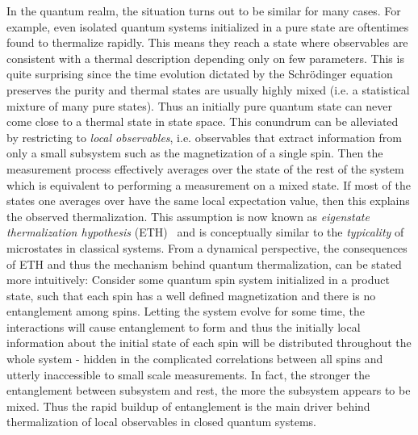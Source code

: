 In the quantum realm, the situation turns out to be similar for many cases. For example, even isolated quantum systems initialized in a pure state are oftentimes found to thermalize rapidly. This means they reach a state where observables are consistent with a thermal description depending only on few parameters. This is quite surprising since the time evolution dictated by the Schrödinger equation preserves the purity and %
 thermal states are usually highly mixed (i.e. a statistical mixture of many pure states). 
Thus an initially pure quantum state can never come close to a thermal state in state space. 
This conundrum can be alleviated by restricting to \emph{local observables}, i.e. observables that extract information from only a small subsystem such as the magnetization of a single spin. Then the measurement process effectively averages over the state of the rest of the system which is equivalent to performing a measurement on a mixed state. 
If most of the states one averages over have the same local expectation value, then this explains the observed thermalization. This assumption is now known as \emph{eigenstate thermalization hypothesis} (ETH)~\cite{deutschQuantumStatisticalMechanics1991,srednickiChaosQuantumThermalization1994, deutschEigenstateThermalizationHypothesis2018} and is conceptually similar to the \emph{typicality} of microstates in classical systems.
From a dynamical perspective, the consequences of ETH and thus the mechanism behind quantum thermalization, can be stated more intuitively: Consider some quantum spin system initialized in a product state, such that each spin has a well defined magnetization and there is no entanglement among spins. Letting the system evolve for some time, the interactions will cause entanglement to form and thus the initially local information about the initial state of each spin will be distributed throughout the whole system - hidden in the complicated correlations between all spins and utterly inaccessible to small scale measurements. In fact, 
the stronger the entanglement between subsystem and rest, the more the subsystem appears to be mixed.
Thus the rapid buildup of entanglement is the main driver behind thermalization of local observables in closed quantum systems.

